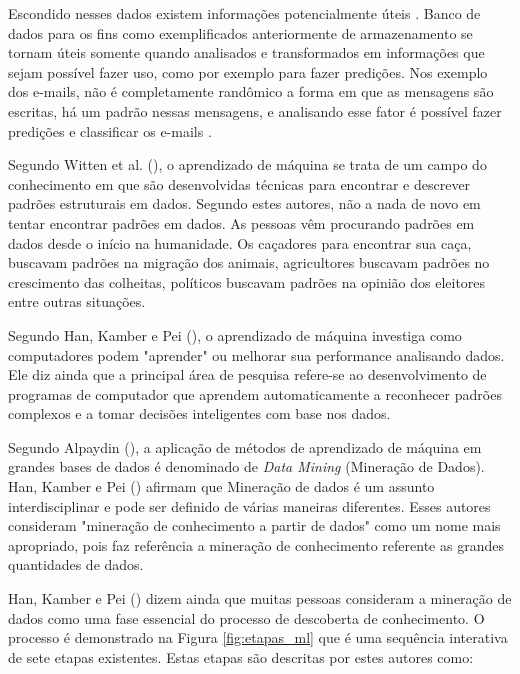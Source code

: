 Escondido nesses dados existem informações potencialmente úteis \cite{Witten:2016:DMF:3086818}. Banco de dados para os fins como exemplificados anteriormente de armazenamento se tornam úteis somente quando analisados e transformados em informações que sejam possível fazer uso, como por exemplo para fazer predições. Nos exemplo dos e-mails, não é completamente randômico a forma em que as mensagens são escritas, há um padrão nessas mensagens, e analisando esse fator é possível fazer predições e classificar os e-mails \cite{Alpaydin:2010:IML:1734076}.

Segundo Witten et al. (\citeyear{Witten:2016:DMF:3086818}), o aprendizado de máquina se trata de um campo do conhecimento em que são desenvolvidas técnicas para encontrar e descrever padrões estruturais em dados. Segundo estes autores, não a nada de novo em tentar encontrar padrões em dados. As pessoas vêm procurando padrões em dados desde o início na humanidade. Os caçadores para encontrar sua caça, buscavam padrões na migração dos animais, agricultores buscavam padrões no crescimento das colheitas, políticos buscavam padrões na opinião dos eleitores entre outras situações.

Segundo Han, Kamber e Pei (\citeyear{Han:2011:DMC:1972541}), o aprendizado de máquina investiga como computadores podem "aprender" ou melhorar sua performance analisando dados. Ele diz ainda que a principal área de pesquisa refere-se ao desenvolvimento de programas de computador que aprendem automaticamente a reconhecer padrões complexos e a tomar decisões inteligentes com base nos dados.

Segundo Alpaydin (\citeyear{Alpaydin:2010:IML:1734076}), a aplicação de métodos de aprendizado de máquina em grandes bases de dados é denominado de \textit{Data Mining} (Mineração de Dados). Han, Kamber e Pei (\citeyear{Han:2011:DMC:1972541}) afirmam que Mineração de dados é um assunto interdisciplinar e pode ser definido de várias maneiras diferentes. Esses autores consideram "mineração de conhecimento a partir de dados" como um nome mais apropriado, pois faz referência a mineração de conhecimento referente as grandes quantidades de dados.

Han, Kamber e Pei (\citeyear{Han:2011:DMC:1972541}) dizem ainda que muitas pessoas consideram a mineração de dados como uma fase essencial do processo de descoberta de conhecimento. O processo é demonstrado na Figura \ref{fig:etapas_ml} que é uma sequência interativa de sete etapas existentes. Estas etapas são descritas por estes autores como:

